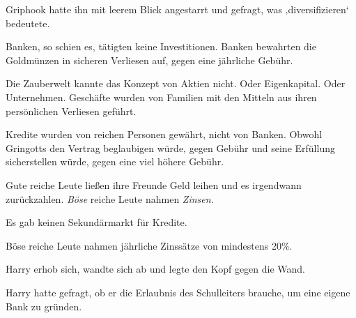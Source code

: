 Griphook hatte ihn mit leerem Blick angestarrt und gefragt, was ‚diversifizieren‘ bedeutete.

Banken, so schien es, tätigten keine Investitionen. Banken bewahrten die Goldmünzen in sicheren Verliesen auf, gegen eine jährliche Gebühr.

Die Zauberwelt kannte das Konzept von Aktien nicht. Oder Eigenkapital. Oder Unternehmen. Geschäfte wurden von Familien mit den Mitteln aus ihren persönlichen Verliesen geführt.

Kredite wurden von reichen Personen gewährt, nicht von Banken. Obwohl Gringotts den Vertrag beglaubigen würde, gegen Gebühr und seine Erfüllung sicherstellen würde, gegen eine viel höhere Gebühr.

Gute reiche Leute ließen ihre Freunde Geld leihen und es irgendwann zurückzahlen. \emph{Böse} reiche Leute nahmen \emph{Zinsen}.%

Es gab keinen Sekundärmarkt für Kredite.

Böse reiche Leute nahmen jährliche Zinssätze von mindestens 20\%.

Harry erhob sich, wandte sich ab und legte den Kopf gegen die Wand.

Harry hatte gefragt, ob er die Erlaubnis des Schulleiters brauche, um eine eigene Bank zu gründen.

